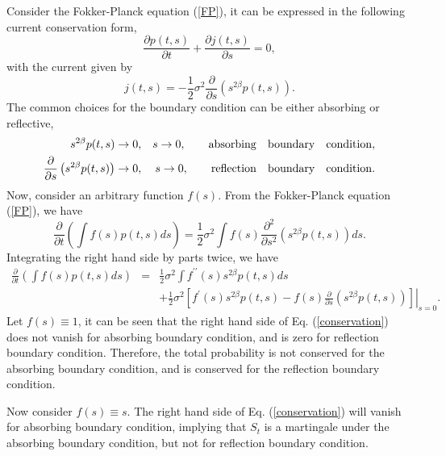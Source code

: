 \documentclass[12pt]{article}
\begin{document}
  Consider the Fokker-Planck equation (\ref{FP}), it can be expressed in the following current conservation form,
  \begin{equation}
    \frac{\partial p(t,s)}{\partial t} + \frac{\partial j(t,s)}{\partial s} = 0,
  \end{equation}
  with the current given by
  \begin{equation}
    j(t,s) = -\frac{1}{2}\sigma^2\frac{\partial }{\partial s}\left(s^{2\beta}p(t,s)\right).
  \end{equation}
  The common choices for the boundary condition can be either absorbing or reflective,
  \begin{eqnarray}
    s^{2\beta}p(t,s) \rightarrow 0,
        && s\rightarrow 0,\quad\quad {\rm absorbing\quad boundary \quad condition}, \\
    \frac{\partial}{\partial s}\left(s^{2\beta}p(t,s)\right) \rightarrow 0,
        && s\rightarrow 0,\quad\quad {\rm reflection \quad boundary \quad condition}.
  \end{eqnarray}
  Now, consider an arbitrary function $f(s)$. From the Fokker-Planck equation (\ref{FP}), we
  have
  \begin{equation}
    \frac{\partial}{\partial t}\left(\int f(s)p(t,s)ds\right) = \frac{1}{2}\sigma^2\int f(s)\frac{\partial^2}{\partial s^2}
    \left(s^{2\beta}p(t,s)\right)ds.
  \end{equation}
  Integrating the right hand side by parts twice, we have
  \begin{eqnarray}
    \frac{\partial}{\partial t}\left(\int f(s)p(t,s)ds\right) &=& \frac{1}{2}\sigma^2\int f^{\prime\prime}(s)s^{2\beta}p(t,s)ds\nonumber \\
          && + \left . \frac{1}{2}\sigma^2\left[f^{\prime}(s)s^{2\beta}p(t,s) - f(s)\frac{\partial}{\partial s}
                \left(s^{2\beta}p(t,s)\right)\right]\right|_{s=0}.
    \label{conservation}
  \end{eqnarray}
  Let $f(s)\equiv 1$, it can be seen that the right hand side of Eq. (\ref{conservation}) does not vanish for absorbing
  boundary condition, and is zero for reflection boundary condition. Therefore, the total probability is not conserved for
  the absorbing boundary condition, and is conserved for the reflection boundary condition.

  Now consider $f(s)\equiv s$. The right hand side of Eq. (\ref{conservation}) will vanish for absorbing
  boundary condition, implying that $S_t$ is a martingale under the absorbing boundary condition, but not for reflection
  boundary condition.
\end{document}
